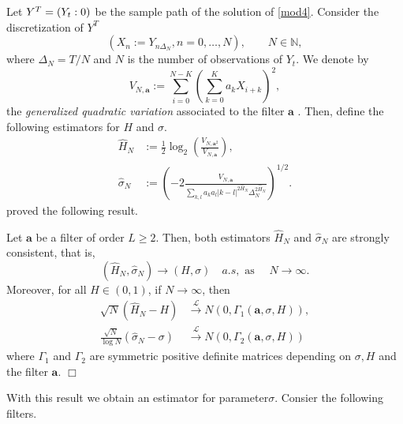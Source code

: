 \documentclass[smallextended]{svjour3}
\newcommand{\IN}{{\mathbb N}}
\begin{document}
    Let $Y^T=(Y_t: 0 \let \le T)$ be  the sample path of the solution of
    \eqref{mod4}. Consider the discretization of $Y^T$
    \[
        (X_n:=Y_{n\Delta_N}, n=0,\ldots,N),\qquad
        N\in \IN,
    \]
    where $\Delta_N=T/N$ and $N$ is the number of observations of $Y_t$. 
    We denote by
    \begin{equation*}
        V_{N,\bm{a}}:= 
        \sum_{i=0} ^ {N - K}
            \left( 
                \sum_{k=0} ^ K a_k X_{i+k} 
            \right)^2,
    \end{equation*}
    the \emph{generalized quadratic variation} associated to the filter $\bm{a}$
    \citet[see, for example][]{is-la}. Then, define the
    following estimators for $H$ and $\sigma$.
    \begin{align}
        \hat{H}_N &:=
        \tfrac{1}{2} \log_2 
        \left(
            \frac{
                V_{N,\bm{a}^2}
            }{
                V_{N,\bm{a}}
            }
        \right), \label{est1}
        \\
        \hat{\sigma}_N
            &:=\left(
                -2
                \frac{V_{N,\bm{a}}}{\sum_{k,l} a_ka_l |k-l|^{2\hat{H}_N} 
                \Delta_N^{2 \hat{H}_N } }\right)^{1/2}.
            \label{est2}
    \end{align}
    \citet[][]{br-ia} proved the following result.
    \begin{theorem}
        Let  $\bm{a}$ be a filter of order $L \ge 2$. Then, both estimators
        $\hat{H}_N$ and $\hat{\sigma}_N$  are
        strongly consistent, that is,
        \[
            (\hat{H}_N,\hat{\sigma}_N) 
            \to
            (H,\sigma) \quad a.s, \text{ as } \quad N \to \infty.
        \]
        Moreover, for all $H \in (0, 1)$, if $N \to  \infty$, then
    \begin{align*}
        \sqrt{N} (\hat{H}_N  - H ) 
            &
            \stackrel{\mathcal{L}}{\to} 
            N (0,\Gamma_1 ( \bm{a},\sigma,H)),
            \\
            \frac{\sqrt{N}}{\log N} ( \hat{\sigma}_N  - \sigma )
            &
            \stackrel{\mathcal{L}}{\to} N (0, \Gamma_2 (\bm{a},\sigma,H))
    \end{align*}
%
    where $\Gamma_1$ and $\Gamma_2$ are symmetric positive definite matrices
    depending on $\sigma, H$ and the filter $\bm{a}$.
    \hfill$\Box$
\end{theorem}

    With this result we obtain an estimator for parameter$\sigma$.
    Consier the following filters.
\end{document}
